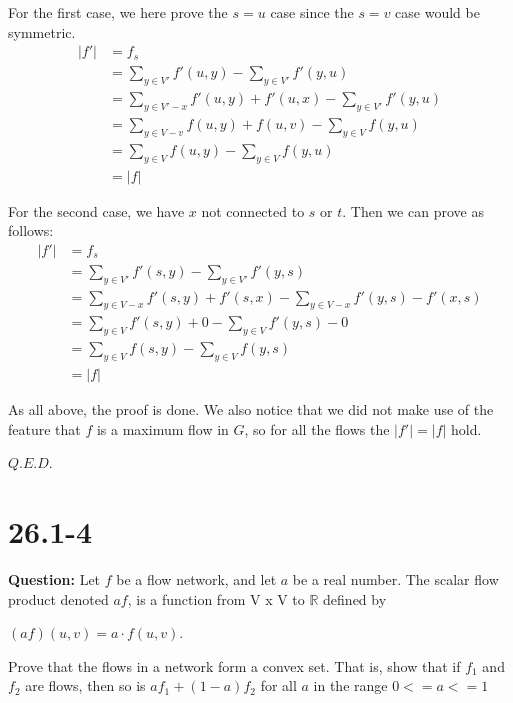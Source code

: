 \documentclass[12pt]{article}
\begin{document}
For the first case, we here prove the $s=u$ case since the $s=v$ case would be symmetric.
\begin{equation}
\begin{aligned}
 |f'| &= f_s\\
 &= \sum_{y \in V'} f'(u,y) - \sum_{y \in V'} f'(y,u) \\
 &= \sum_{y \in V'-{x}} f'(u,y) + f'(u,x) - \sum_{y \in V'} f'(y,u)\\
 &= \sum_{y \in V-{v}} f(u,y) + f(u,v) - \sum_{y \in V} f(y,u)\\
 &= \sum_{y \in V} f(u,y)  - \sum_{y \in V} f(y,u)\\
 &=|f|
\end{aligned}
 \end{equation}

For the second case, we have $x$ not connected to $s$ or $t$. Then we can prove as follows:
\begin{equation}
\begin{aligned}
 |f'| &= f_s\\
 &= \sum_{y \in V'} f'(s,y) - \sum_{y \in V'} f'(y,s) \\
 &= \sum_{y \in V-{x}} f'(s,y) + f'(s,x) - \sum_{y \in V-{x}} f'(y,s) - f'(x,s) \\
 &= \sum_{y \in V} f'(s,y) + 0 - \sum_{y \in V} f'(y,s) - 0 \\
 &= \sum_{y \in V} f(s,y) - \sum_{y \in V} f(y,s)  \\
 &= |f|
 \end{aligned}
 \end{equation}

As all above, the proof is done. We also notice that we did not make use of the feature that $f$ is a maximum flow in $G$, so for all the flows the $|f'| =|f|$ hold.



$Q.E.D.$
\section{26.1-4}
\textbf{Question: } Let $f$ be a flow network, and let $a$ be a real number. The scalar flow product denoted $af$, is a function from V x V to $\mathbb{R}$ defined by 

$(af)(u, v) = a \cdot f(u, v).$

Prove that the flows in a network form a convex set. That is, show that if $f_1$ and $f_2$ are flows, then so is $af_1+(1-a)f_2$ for all $a$ in the range $0<=a<=1$
\end{document}
